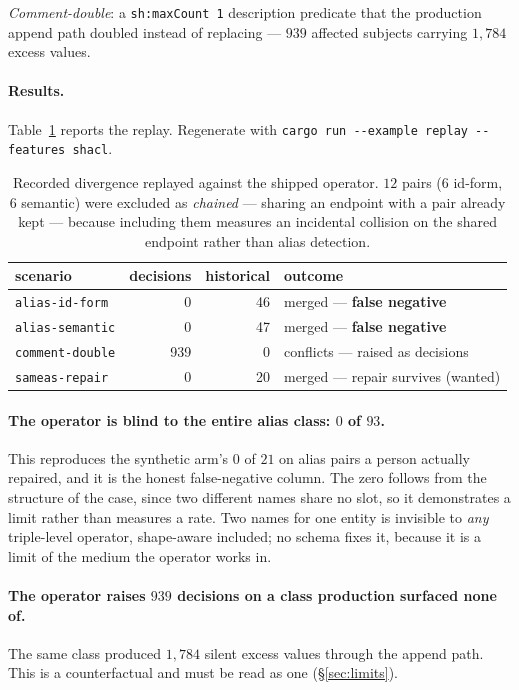 \emph{Comment-double}: a \texttt{sh:maxCount 1} description predicate that the
production append path doubled instead of replacing --- $939$ affected subjects
carrying $1{,}784$ excess values.

\paragraph{Results.} Table~\ref{tab:armB} reports the replay. Regenerate with
\texttt{cargo run -{}-example replay -{}-features shacl}.

\begin{table}[t]
\centering\small
\begin{tabular}{lrrl}
\toprule
scenario & decisions & historical & outcome \\
\midrule
\texttt{alias-id-form}   & 0   & 46 & merged --- \textbf{false negative} \\
\texttt{alias-semantic}  & 0   & 47 & merged --- \textbf{false negative} \\
\texttt{comment-double}  & 939 & 0  & conflicts --- raised as decisions \\
\texttt{sameas-repair}   & 0   & 20 & merged --- repair survives (wanted) \\
\bottomrule
\end{tabular}
\caption{Recorded divergence replayed against the shipped operator. $12$ pairs
($6$ id-form, $6$ semantic) were excluded as \emph{chained} --- sharing an
endpoint with a pair already kept --- because including them measures an incidental
collision on the shared endpoint rather than alias detection.}
\label{tab:armB}
\end{table}

\paragraph{The operator is blind to the entire alias class: $0$ of $93$.} This
reproduces the synthetic arm's $0$ of $21$ on alias pairs a person actually
repaired, and it is the honest false-negative column. The zero follows from the
structure of the case, since two different names share no slot, so it
demonstrates a limit rather than measures a rate. Two names for one entity is
invisible to \emph{any} triple-level operator, shape-aware included; no schema
fixes it, because it is a limit of the medium the operator works in.

\paragraph{The operator raises $939$ decisions on a class production surfaced
none of.} The same class produced $1{,}784$ silent excess values through the
append path. This is a counterfactual and must be read as one
(\S\ref{sec:limits}).

